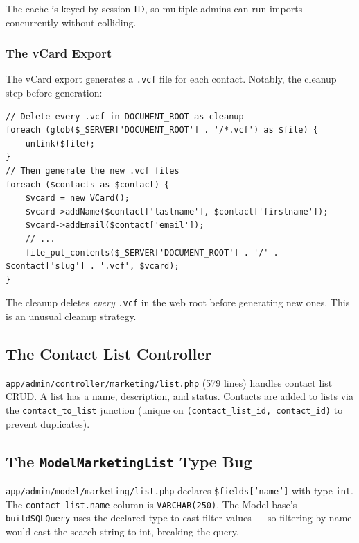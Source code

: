 \documentclass[11pt,a4paper]{article}
\begin{document}
The cache is keyed by session ID, so multiple admins can run
imports concurrently without colliding.

\subsubsection{The vCard Export}

The vCard export generates a \texttt{.vcf} file for each contact.
Notably, the cleanup step before generation:

\begin{lstlisting}[caption={The vCard export cleanup (abridged).},label={lst:vcard-cleanup}]
// Delete every .vcf in DOCUMENT_ROOT as cleanup
foreach (glob($_SERVER['DOCUMENT_ROOT'] . '/*.vcf') as $file) {
    unlink($file);
}
// Then generate the new .vcf files
foreach ($contacts as $contact) {
    $vcard = new VCard();
    $vcard->addName($contact['lastname'], $contact['firstname']);
    $vcard->addEmail($contact['email']);
    // ...
    file_put_contents($_SERVER['DOCUMENT_ROOT'] . '/' . $contact['slug'] . '.vcf', $vcard);
}
\end{lstlisting}

The cleanup deletes \emph{every} \texttt{.vcf} in the web root
before generating new ones. This is an unusual cleanup strategy.

\subsection{The Contact List Controller}

\texttt{app/admin/controller/marketing/list.php} (579 lines)
handles contact list CRUD. A list has a name, description, and
status. Contacts are added to lists via the
\texttt{contact\_to\_list} junction (unique on
\texttt{(contact\_list\_id, contact\_id)} to prevent duplicates).

\subsection{The \texttt{ModelMarketingList} Type Bug}

\begin{findingbox}
\texttt{app/admin/model/marketing/list.php} declares
\texttt{\$fields['name']} with type \texttt{int}. The
\texttt{contact\_list.name} column is \texttt{VARCHAR(250)}. The
Model base's \texttt{buildSQLQuery} uses the declared type to
cast filter values --- so filtering by name would cast the
search string to int, breaking the query.
\end{findingbox}
\end{document}
